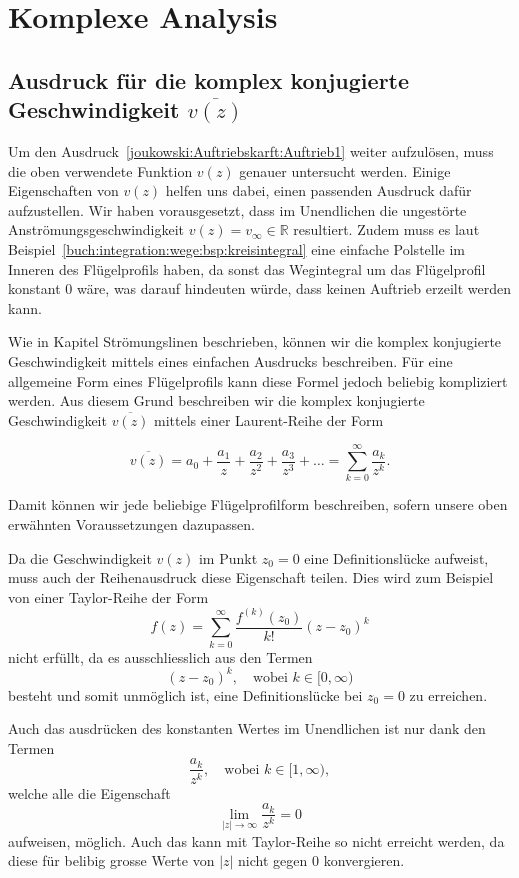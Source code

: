 \section{Komplexe Analysis}
\label{joukowski:sec:komplexe-analysis}

\subsection{Ausdruck für die komplex konjugierte Geschwindigkeit $\overline{v(z)}$}

Um den Ausdruck~\eqref{joukowski:Auftriebskarft:Auftrieb1} weiter aufzulösen, muss die oben verwendete Funktion $v(z)$ genauer untersucht werden.
Einige Eigenschaften von $v(z)$ helfen uns dabei, einen passenden Ausdruck dafür aufzustellen.
Wir haben vorausgesetzt, dass im Unendlichen die ungestörte Anströmungsgeschwindigkeit $v(z) = v_\infty \in \mathbb{R}$ resultiert.
Zudem muss es laut Beispiel~\ref{buch:integration:wege:bsp:kreisintegral} eine einfache Polstelle im Inneren des Flügelprofils haben,
da sonst das Wegintegral um das Flügelprofil konstant $0$ wäre,
was darauf hindeuten würde, dass keinen Auftrieb erzeilt werden kann.

Wie in Kapitel
Strömungslinen beschrieben,
können wir die komplex konjugierte Geschwindigkeit mittels eines einfachen Ausdrucks beschreiben.
Für eine allgemeine Form eines Flügelprofils kann diese Formel jedoch beliebig kompliziert werden.
Aus diesem Grund beschreiben wir die komplex konjugierte Geschwindigkeit $\overline{v(z)}$ mittels einer Laurent-Reihe der Form

\[
	\overline{v(z)} 
	= 
	a_0 + \frac{a_1}{z} + \frac{a_2}{z^2} + \frac{a_3}{z^3} + \dots 
	= 
	\sum_{k=0}^{\infty} \frac{a_k}{z^k}.
\]

Damit können wir jede beliebige Flügelprofilform beschreiben,
sofern unsere oben erwähnten Voraussetzungen dazupassen.

Da die Geschwindigkeit $v(z)$ im Punkt $z_0 = 0$ eine Definitionslücke aufweist,
muss auch der Reihenausdruck diese Eigenschaft teilen.
Dies wird zum Beispiel von einer Taylor-Reihe der Form
\[
	f(z)
	=
	\displaystyle\sum_{k = 0}^{\infty}
	\frac{f^{(k)}(z_0)}{k!}
	(z - z_0)^k
\]
nicht erfüllt, da es ausschliesslich aus den Termen
\[
	(z - z_0)^k,
	\quad
	\text{wobei }
	k \in [0, \infty)
\]
besteht und somit unmöglich ist, eine Definitionslücke bei $z_0 = 0$ zu erreichen.

Auch das ausdrücken des konstanten Wertes im Unendlichen ist nur dank den Termen
\[
	\frac{a_k}{z^k},
	\quad
	\text{wobei }
	k \in [1, \infty),
\]
welche alle die Eigenschaft
\begin{equation}
	\displaystyle\lim_{|z|\to \infty}
	\frac{a_k}{z^k}
	=
	0
	\label{joukowski:komplexe-analysis:grenzwert-von-laurent-reihe}
\end{equation}
aufweisen, möglich.
Auch das kann mit Taylor-Reihe so nicht erreicht werden, da diese für belibig grosse Werte von $|z|$ nicht gegen $0$ konvergieren.

